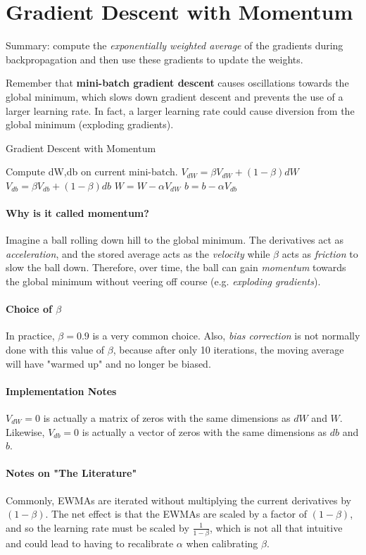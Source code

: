 \documentclass{article}
\begin{document}
\section{Gradient Descent with Momentum}

Summary: compute the \textit{exponentially weighted average} of the gradients during backpropagation and then use these gradients to update the weights.

Remember that \textbf{mini-batch gradient descent} causes oscillations towards the global minimum, which slows down gradient descent and prevents the use of a larger learning rate.  In fact, a larger learning rate could cause diversion from the global minimum (exploding gradients).

\begin{algorithm}[h]
\label{alg:grad_with_momentum}
\caption{Gradient Descent with Momentum}
Compute dW,db on current mini-batch. \;
$V_{dW} = \beta V_{dW} + (1-\beta) dW$ \;
$V_{db} = \beta V_{db} + (1-\beta) db$ \;
$W = W - \alpha V_{dW}$ \;
$b = b - \alpha V_{db}$ \;
\end{algorithm}

\paragraph{Why is it called momentum?}

Imagine a ball rolling down hill to the global minimum.  The derivatives act as \textit{acceleration}, and the stored average acts as the \textit{velocity} while $\beta$ acts as \textit{friction} to slow the ball down.  Therefore, over time, the ball can gain \textit{momentum} towards the global minimum without veering off course (e.g. \textit{exploding gradients}).

\paragraph{Choice of $\beta$}

In practice, $\beta = 0.9$ is a very common choice.  Also, \textit{bias correction} is not normally done with this value of $\beta$, because after only 10 iterations, the moving average will have "warmed up" and no longer be biased.

\paragraph{Implementation Notes}

$V_{dW} = 0$ is actually a matrix of zeros with the same dimensions as $dW$ and $W$.  Likewise, $V_{db} = 0$ is actually a vector of zeros with the same dimensions as $db$ and $b$.

\paragraph{Notes on "The Literature"}

Commonly, EWMAs are iterated without multiplying the current derivatives by $(1-\beta)$.  The net effect is that the EWMAs are scaled by a factor of $(1-\beta)$, and so the learning rate must be scaled by $\frac{1}{1-\beta}$, which is not all that intuitive and could lead to having to recalibrate $\alpha$ when calibrating $\beta$.
\end{document}
